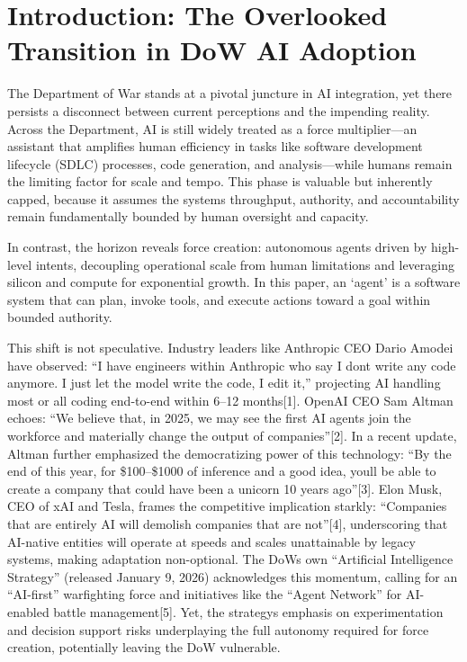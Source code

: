 \documentclass[11pt]{article}
\begin{document}
\section{Introduction: The Overlooked Transition in DoW AI Adoption}\label{introduction-the-overlooked-transition-in-dod-ai-adoption}

The Department of War stands at a pivotal juncture in AI integration, yet there persists a disconnect between current perceptions and the impending reality. Across the Department, AI is still widely treated as a force multiplier---an assistant that amplifies human efficiency in tasks like software development lifecycle (SDLC) processes, code generation, and analysis---while humans remain the limiting factor for scale and tempo. This phase is valuable but inherently capped, because it assumes the system\textquotesingle s throughput, authority, and accountability remain fundamentally bounded by human oversight and capacity.

In contrast, the horizon reveals force creation: autonomous agents driven by high-level intents, decoupling operational scale from human limitations and leveraging silicon and compute for exponential growth. In this paper, an `agent' is a software system that can plan, invoke tools, and execute actions toward a goal within bounded authority.

This shift is not speculative. Industry leaders like Anthropic CEO Dario Amodei have observed: ``I have engineers within Anthropic who say I don\textquotesingle t write any code anymore. I just let the model write the code, I edit it,'' projecting AI handling most or all coding end-to-end within 6--12 months[1]. OpenAI CEO Sam Altman echoes: ``We believe that, in 2025, we may see the first AI agents \textquotesingle join the workforce\textquotesingle{} and materially change the output of companies''[2]. In a recent update, Altman further emphasized the democratizing power of this technology: ``By the end of this year, for \$100--\$1000 of inference and a good idea, you\textquotesingle ll be able to create a company that could have been a unicorn 10 years ago''[3]. Elon Musk, CEO of xAI and Tesla, frames the competitive implication starkly: ``Companies that are entirely AI will demolish companies that are not''[4], underscoring that AI-native entities will operate at speeds and scales unattainable by legacy systems, making adaptation non-optional. The DoW\textquotesingle s own ``Artificial Intelligence Strategy'' (released January 9, 2026) acknowledges this momentum, calling for an ``AI-first'' warfighting force and initiatives like the ``Agent Network'' for AI-enabled battle management[5]. Yet, the strategy\textquotesingle s emphasis on experimentation and decision support risks underplaying the full autonomy required for force creation, potentially leaving the DoW vulnerable.
\end{document}
